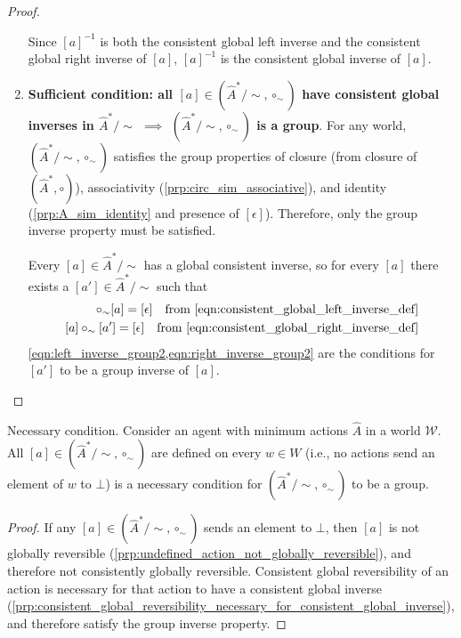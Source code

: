 \begin{proof}
\begin{enumerate}[(1)]
    Since $[a]^{-1}$ is both the consistent global left inverse and the consistent global right inverse of $[a]$, $[a]^{-1}$ is the consistent global inverse of $[a]$.


    \item \textbf{Sufficient condition: all $[a] \in (\hat{A}^{*}/\sim, \circ_{\sim})$ have consistent global inverses in $\hat{A}^{*}/\sim$ $\implies$ $(\hat{A}^{*}/\sim, \circ_{\sim})$ is a group}.
    For any world, $(\hat{A}^{*}/\sim, \circ_{\sim})$ satisfies the group properties of closure (from closure of $(\hat{A}^{*}, \circ)$), associativity (\cref{prp:circ_sim_associative}), and identity (\cref{prp:A_sim_identity} and presence of $[\epsilon]$).
    Therefore, only the group inverse property must be satisfied.
    
    Every $[a] \in \hat{A}^{*}/\sim$ has a global consistent inverse, so for every $[a]$ there exists a $[a'] \in \hat{A}^{*}/\sim$ such that
    \begin{align}
        [a'] \circ_{\sim} [a] = [\epsilon] \quad \text{from \cref{eqn:consistent_global_left_inverse_def}}
        \label{eqn:left_inverse_group2} \\
        [a] \circ_{\sim} [a'] = [\epsilon] \quad \text{from \cref{eqn:consistent_global_right_inverse_def}}
        \label{eqn:right_inverse_group2}
    \end{align}
    \cref{eqn:left_inverse_group2,eqn:right_inverse_group2} are the conditions for $[a']$ to be a group inverse of $[a]$.
\end{enumerate}
\end{proof}




\begin{proposition}
    Necessary condition.
    Consider an agent with minimum actions $\hat{A}$ in a world $\mathscr{W}$.
    All $[a] \in (\hat{A}^{*}/\sim, \circ_{\sim})$ are defined on every $w \in W$ (i.e., no actions send an element of $w$ to $\bot$) is a necessary condition for $(\hat{A}^{*}/\sim, \circ_{\sim})$ to be a group.
\end{proposition}
\begin{proof}
    If any $[a] \in (\hat{A}^{*}/\sim, \circ_{\sim})$ sends an element to $\bot$, then $[a]$ is not globally reversible (\cref{prp:undefined_action_not_globally_reversible}), and therefore not consistently globally reversible.
    Consistent global reversibility of an action is necessary for that action to have a consistent global inverse (\cref{prp:consistent_global_reversibility_necessary_for_consistent_global_inverse}), and therefore satisfy the group inverse property.
\end{proof}

